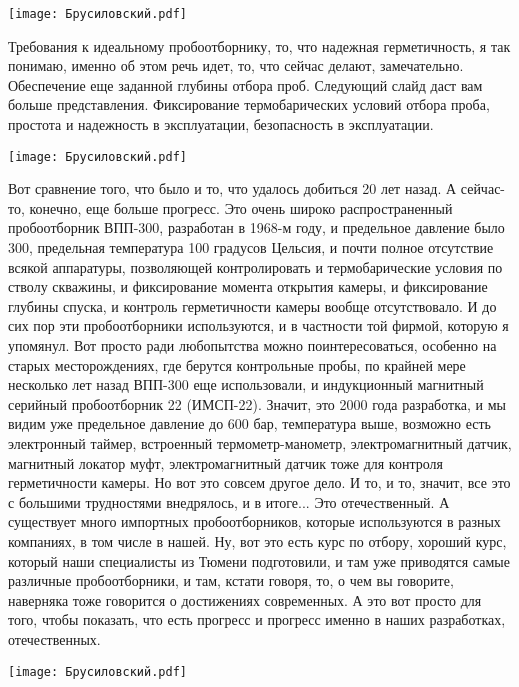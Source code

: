 \documentclass[main.tex]{subfiles}
\begin{document}
\begin{center}
\texttt{[image: Брусиловский.pdf]}
\end{center}

Требования к идеальному пробоотборнику, то, что надежная герметичность, я так понимаю, именно об этом речь идет, то, что сейчас делают, замечательно.
Обеспечение еще заданной глубины отбора проб.
Следующий слайд даст вам больше представления.
Фиксирование термобарических условий отбора проба, простота и надежность в эксплуатации, безопасность в эксплуатации.

\begin{center}
\texttt{[image: Брусиловский.pdf]}
\end{center}

Вот сравнение того, что было и то, что удалось добиться 20 лет назад.
А сейчас-то, конечно, еще больше прогресс.
Это очень широко распространенный пробоотборник ВПП-300, разработан в 1968-м году, и предельное давление было 300, предельная температура 100 градусов Цельсия, и почти полное отсутствие всякой аппаратуры, позволяющей контролировать и термобарические условия по стволу скважины, и фиксирование момента открытия камеры, и фиксирование глубины спуска, и контроль герметичности камеры вообще отсутствовало.
И до сих пор эти пробоотборники используются, и в частности той фирмой, которую я упомянул.
Вот просто ради любопытства можно поинтересоваться, особенно на старых месторождениях, где берутся контрольные пробы, по крайней мере несколько лет назад ВПП-300 еще использовали, и индукционный магнитный серийный пробоотборник 22 (ИМСП-22).
Значит, это 2000 года разработка, и мы видим уже предельное давление до 600 бар, температура выше, возможно есть электронный таймер, встроенный термометр-манометр, электромагнитный датчик, магнитный локатор муфт, электромагнитный датчик тоже для контроля герметичности камеры.
Но вот это совсем другое дело.
И то, и то, значит, все это с большими трудностями внедрялось, и в итоге... Это отечественный.
А существует много импортных пробоотборников, которые используются в разных компаниях, в том числе в нашей.
Ну, вот это есть курс по отбору, хороший курс, который наши специалисты из Тюмени подготовили, и там уже приводятся самые различные пробоотборники, и там, кстати говоря, то, о чем вы говорите, наверняка тоже говорится о достижениях современных.
А это вот просто для того, чтобы показать, что есть прогресс и прогресс именно в наших разработках, отечественных.

\begin{center}
\texttt{[image: Брусиловский.pdf]}
\end{center}
\end{document}
